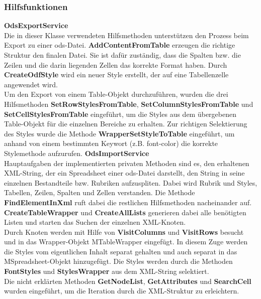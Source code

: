 \subsubsection{Hilfsfunktionen}
\label{loHelper}
\textbf{OdsExportService}\\
Die in dieser Klasse verwendeten Hilfsmethoden unterstützen den Prozess beim Export zu einer ods-Datei. \textbf{AddContentFromTable} erzeugen die richtige Struktur den finalen Datei. Sie ist dafür zuständig, dass die Spalten bzw. die Zeilen und die darin liegenden Zellen das korrekte Format haben. Durch \textbf{CreateOdfStyle} wird ein neuer Style erstellt, der auf eine Tabellenzelle angewendet wird.\\
Um den Export von einem Table-Objekt durchzuführen, wurden die drei Hilfsmethoden \textbf{SetRowStylesFromTable}, \textbf{SetColumnStylesFromTable} und \textbf{SetCellStylesFromTable} eingeführt, um die Styles aus dem übergebenen Table-Objekt für die einzelnen Bereiche zu erhalten. Zur richtigen Selektierung des Styles wurde die Methode \textbf{WrapperSetStyleToTable} eingeführt, um anhand von einem bestimmten Keywort (z.B. font-color) die korrekte Stylemethode aufzurufen.
\textbf{OdsImportService}\\
Hauptaufgaben der implementierten privaten Methoden sind es, den erhaltenen XML-String, der ein Spreadsheet einer ods-Datei darstellt, den String in seine einzelnen Bestandteile bzw. Rubriken aufzuspliten. Dabei wird Rubrik und Styles, Tabellen, Zeilen, Spalten und Zellen verstanden. Die Methode \textbf{FindElementInXml} ruft dabei die restlichen Hilfsmethoden nacheinander auf. \textbf{CreateTableWrapper} und \textbf{\textbf{CreateAllLists}} generieren dabei alle benötigten Listen und starten das Suchen der einzelnen XML-Knoten.\\
Durch Knoten werden mit Hilfe von \textbf{VisitColumns} und \textbf{VisitRows} besucht und in das Wrapper-Objekt MTableWrapper eingefügt. In diesem Zuge werden die Styles vom eigentlichen Inhalt separat gehalten und auch separat in das MSpreadsheet-Objekt hinzugefügt. Die Styles werden durch die Methoden \textbf{FontStyles} und \textbf{StylesWrapper} aus dem XML-String selektiert.\\
Die nicht erklärten Methoden \textbf{GetNodeList}, \textbf{GetAttributes} und \textbf{SearchCell} wurden eingeführt, um die Iteration durch die XML-Struktur zu erleichtern.

\newpage
